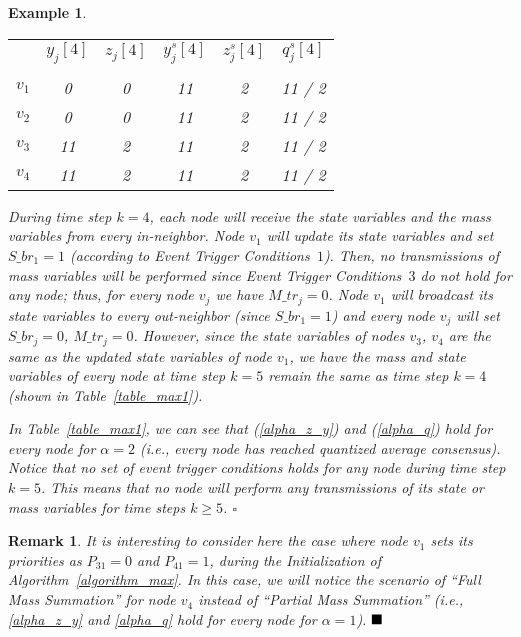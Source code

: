 \documentclass[twocolumn]{autart}    %
\newtheorem{example}{\bfseries Example}
\newtheorem{remark}{Remark}
\begin{document}
\begin{example}
\begin{table}[t]
\begin{center}
{\begin{tabular}{|c||c|c|c|c|c|}
 &$y_j[4]$&$z_j[4]$&$y^s_j[4]$&$z^s_j[4]$&$q^s_j[4]$\\
\cline{1-6}
 &  &  &  &  & \\
$v_1$ & 0 & 0 & 11 & 2 & 11 / 2\\
$v_2$ & 0 & 0 & 11 & 2 & 11 / 2\\
$v_3$ & 11 & 2 & 11 & 2 & 11 / 2\\
$v_4$ & 11 & 2 & 11 & 2 & 11 / 2\\
\hline
\end{tabular}
}
\end{center}
\end{table}
\vspace{0.2cm}


During time step $k=4$, each node will receive the state variables and the mass variables from every in-neighbor. 
Node $v_1$ will update its state variables and set $S\_br_1 = 1$ (according to Event Trigger Conditions~$1$). 
Then, no transmissions of mass variables will be performed since Event Trigger Conditions~$3$ do not hold for any node; thus, for every node $v_j$ we have $M\_tr_j = 0$.
Node $v_1$ will broadcast its state variables to every out-neighbor (since $S\_br_1 = 1$) and every node $v_j$ will set $S\_br_j = 0$, $M\_tr_j = 0$. 
However, since the state variables of nodes $v_3$, $v_4$ are the same as the updated state variables of node $v_1$, we have the mass and state variables of every node at time step $k=5$ remain the same as time step $k=4$ (shown in Table~\ref{table_max1}).  


In Table~\ref{table_max1}, we can see that (\ref{alpha_z_y}) and (\ref{alpha_q}) hold for every node for $\alpha = 2$ (i.e., every node has reached quantized average consensus). 
Notice that no set of event trigger conditions holds for any node during time step $k = 5$. 
This means that no node will perform any transmissions of its state or mass variables for time steps $k \geq 5$. \hspace*{\fill} $\square$
\end{example} 


\begin{remark}
It is interesting to consider here the case where node $v_1$ sets its priorities as $P_{31} = 0$ and $P_{41} = 1$, during the Initialization of Algorithm~\ref{algorithm_max}. 
In this case, we will notice the scenario of ``Full Mass Summation'' for node $v_4$ instead of ``Partial Mass Summation'' (i.e., \eqref{alpha_z_y} and \eqref{alpha_q} hold for every node for $\alpha = 1$). $\hfill \blacksquare$
\end{remark}
\end{document}
